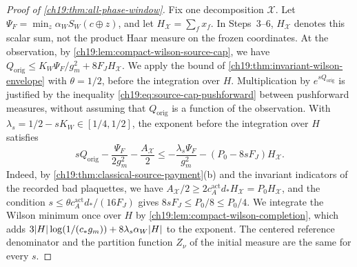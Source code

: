 \begin{proof}[Proof of \cref{ch19:thm:all-phase-window}]
Fix one decomposition $\mathcal X$. Let $\Psi_F=\min_z\alpha_WS_W(c\oplus z)$, and let $H_{\mathcal X}=\sum_fx_f$. In Steps~3--6, $H_{\mathcal X}$ denotes this scalar sum, not the product Haar measure on the frozen coordinates. At the observation, by \cref{ch19:lem:compact-wilson-source-cap}, we have $Q_{\mathrm{orig}}\le K_W\Psi_F/g_m^2+8F_JH_{\mathcal X}$. We apply the bound of \cref{ch19:thm:invariant-wilson-envelope} with $\theta=1/2$, before the integration over $H$. Multiplication by $e^{sQ_{\mathrm{orig}}}$ is justified by the inequality \eqref{ch19:eq:source-cap-pushforward} between pushforward measures, without assuming that $Q_{\mathrm{orig}}$ is a function of the observation. With $\lambda_s=1/2-sK_W\in[1/4,1/2]$, the exponent before the integration over $H$ satisfies
\[
 sQ_{\mathrm{orig}}-\frac{\Psi_F}{2g_m^2}-\frac{A_{\mathcal X}}2\le-\frac{\lambda_s\Psi_F}{g_m^2}-(P_0-8sF_J)H_{\mathcal X}.
\]
Indeed, by \cref{ch19:thm:classical-source-payment}(b) and the invariant indicators of the recorded bad plaquettes, we have $A_{\mathcal X}/2\ge2c_A^{\mathrm{act}}d_*H_{\mathcal X}=P_0H_{\mathcal X}$, and the condition $s\le\theta c_A^{\mathrm{act}}d_*/(16F_J)$ gives $8sF_J\le P_0/8\le P_0/4$. We integrate the Wilson minimum once over $H$ by \cref{ch19:lem:compact-wilson-completion}, which adds $3\lvert H\rvert\log(1/(c_*g_m))+8\lambda_s\alpha_W\lvert H\rvert$ to the exponent. The centered reference denominator and the partition function $Z_\nu$ of the initial measure are the same for every $s$.


\end{proof}
